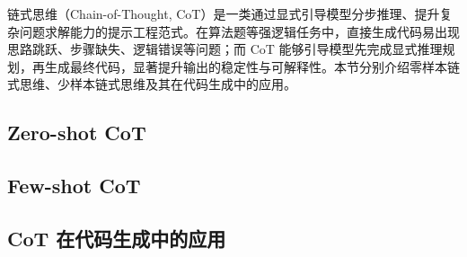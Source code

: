 
链式思维（Chain-of-Thought, CoT）是一类通过显式引导模型分步推理、提升复杂问题求解能力的提示工程范式。在算法题等强逻辑任务中，直接生成代码易出现思路跳跃、步骤缺失、逻辑错误等问题；而 CoT 能够引导模型先完成显式推理规划，再生成最终代码，显著提升输出的稳定性与可解释性。本节分别介绍零样本链式思维、少样本链式思维及其在代码生成中的应用。

\subsection{Zero-shot CoT}


\subsection{Few-shot CoT}


\subsection{CoT 在代码生成中的应用}

